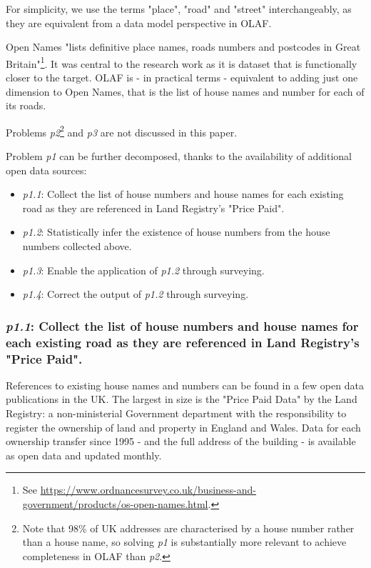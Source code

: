    For simplicity, we use the terms "place", "road" and "street" interchangeably, as they are equivalent from a data model perspective in OLAF.

    Open Names "lists definitive place names, roads numbers and postcodes in Great Britain"\footnote{See \url{https://www.ordnancesurvey.co.uk/business-and-government/products/os-open-names.html}.}. It was central to the research work as it is dataset that is functionally closer to the target. OLAF is - in practical terms - equivalent to adding just one dimension to Open Names, that is the list of house names and number for each of its roads. 
    
    Problems {\it p2}\footnote{Note that 98\% of UK addresses are characterised by a house number rather than a house name, so solving {\it p1} is substantially more relevant to achieve completeness in OLAF than {\it p2}.} and {\it p3} are not discussed in this paper. 
    
    Problem {\it p1} can be further decomposed, thanks to the availability of additional open data sources:
    
    \begin{itemize}
        \item {\it p1.1}: Collect the list of house numbers and house names for each existing road as they are referenced in Land Registry's "Price Paid".
        \item {\it p1.2}: Statistically infer the existence of house numbers from the house numbers collected above.
        \item {\it p1.3}: Enable the application of {\it p1.2} through surveying.
        \item {\it p1.4}: Correct the output of {\it p1.2} through surveying.
    \end{itemize}

    \subsubsection{{\it p1.1}: Collect the list of house numbers and house names for each existing road as they are referenced in Land Registry's "Price Paid".} 

        References to existing house names and numbers can be found in a few open data publications in the UK. The largest in size is the "Price Paid Data" by the Land Registry: a non-ministerial Government department with the responsibility to register the ownership of land and property in England and Wales. Data for each ownership transfer since 1995 - and the full address of the building - is available as open data and updated monthly.
        
